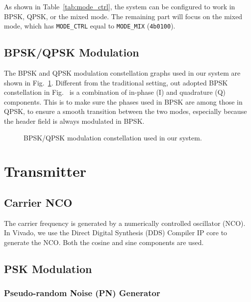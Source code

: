 \documentclass[journal,twoside]{IEEEtran}
\begin{document}
      As shown in Table~\ref{tab:mode_ctrl},
      the system can be configured to work in BPSK, QPSK, or the mixed mode.
      The remaining part will focus on the mixed mode,
      which has \texttt{MODE\_CTRL} equal to \texttt{MODE\_MIX} (\texttt{4\textquotesingle b0100}).

    \subsection{BPSK/QPSK Modulation}

      The BPSK and QPSK modulation constellation graphs used in our system are shown in Fig.~\ref{fig:constellation}.
      Different from the traditional setting, out adopted BPSK constellation in Fig.~
      is a combination of in-phase (I) and quadrature (Q) components.
      This is to make sure the phases used in BPSK are among those in QPSK,
      to ensure a smooth transition between the two modes,
      especially because the header field is always modulated in BPSK.
      \begin{figure}[htbp]
        \hfill%
        \caption{BPSK/QPSK modulation constellation used in our system.}
        \label{fig:constellation}
      \end{figure}

    \section{Transmitter}

    \subsection{Carrier NCO}

      The carrier frequency is generated by a numerically controlled oscillator (NCO).
      In Vivado, we use the Direct Digital Synthesis (DDS) Compiler IP core to generate the NCO.
      Both the cosine and sine components are used.

  \subsection{PSK Modulation}

    \subsubsection{Pseudo-random Noise (PN) Generator}
\end{document}
